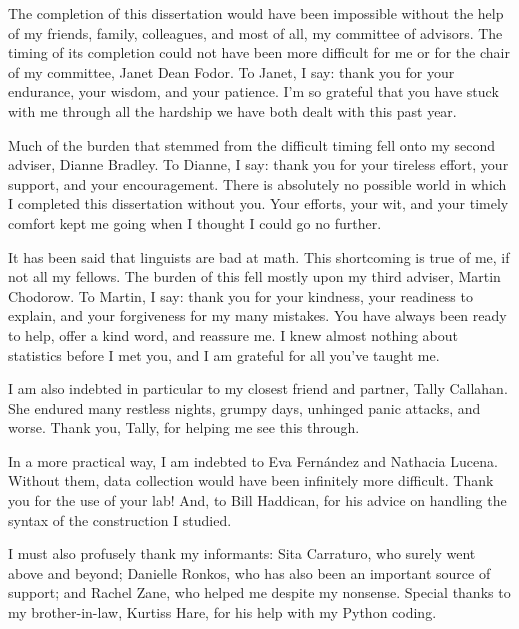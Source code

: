 \documentclass[11pt,oneside]{book}
\begin{document}
\vspace{0.5in}

\raggedright

\setlength\parindent{24pt}\setlength{\parskip}{0.0pt plus 1.0pt}

The completion of this dissertation would have been impossible without the help of my friends, family, colleagues, and most of all, my committee of advisors. The timing of its completion could not have been more difficult for me or for the chair of my committee, Janet Dean Fodor. To Janet, I say: thank you for your endurance, your wisdom, and your patience. I'm so grateful that you have stuck with me through all the hardship we have both dealt with this past year.

Much of the burden that stemmed from the difficult timing fell onto my second adviser, Dianne Bradley. To Dianne, I say: thank you for your tireless effort, your support, and your encouragement. There is absolutely no possible world in which I completed this dissertation without you. Your efforts, your wit, and your timely comfort kept me going when I thought I could go no further.
	
It has been said that linguists are bad at math. This shortcoming is true of me, if not all my fellows. The burden of this fell mostly upon my third adviser, Martin Chodorow. To Martin, I say: thank you for your kindness, your readiness to explain, and your forgiveness for my many mistakes. You have always been ready to help, offer a kind word, and reassure me. I knew almost nothing about statistics before I met you, and I am grateful for all you've taught me.

I am also indebted in particular to my closest friend and partner, Tally Callahan. She endured many restless nights, grumpy days, unhinged panic attacks, and worse. Thank you, Tally, for helping me see this through.

In a more practical way, I am indebted to Eva Fern\'{a}ndez and Nathacia Lucena. Without them, data collection would have been infinitely more difficult. Thank you for the use of your lab! And, to Bill Haddican, for his advice on handling the syntax of the construction I studied. 

I must also profusely thank my informants: Sita Carraturo, who surely went above and beyond; Danielle Ronkos, who has also been an important source of support; and Rachel Zane, who helped me despite my nonsense. Special thanks to my brother-in-law, Kurtiss Hare, for his help with my Python coding.
\end{document}
